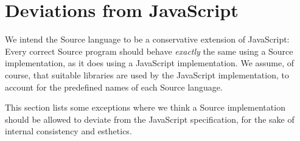 \section*{Deviations from JavaScript}

We intend the 
Source language to be a conservative extension
of JavaScript: Every correct
Source program should behave \emph{exactly} the same
using a Source implementation, as it does using a JavaScript
implementation. We assume, of course, that suitable libraries are
used by the JavaScript implementation, to account for the predefined names
of each Source language.

This section lists some exceptions where we think a Source implementation
should be allowed to deviate from the JavaScript specification, for the
sake of internal consistency and esthetics.

